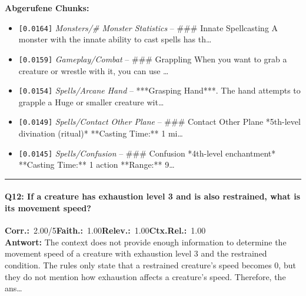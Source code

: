 \noindent\textbf{Abgerufene Chunks:}
\begin{itemize}[noitemsep, topsep=2pt]
  \item[\textbf{\#1}] \texttt{[0.0164]} \textit{Monsters/# Monster Statistics} -- \#\#\# Innate Spellcasting  A monster with the innate ability to cast spells has th\ldots
  \item[\textbf{\#2}] \texttt{[0.0159]} \textit{Gameplay/Combat} -- \#\#\# Grappling  When you want to grab a creature or wrestle with it, you can use \ldots
  \item[\textbf{\#3}] \texttt{[0.0154]} \textit{Spells/Arcane Hand} -- ***Grasping Hand***. The hand attempts to grapple a Huge or smaller creature wit\ldots
  \item[\textbf{\#4}] \texttt{[0.0149]} \textit{Spells/Contact Other Plane} -- \#\#\# Contact Other Plane  *5th-level divination (ritual)*  **Casting Time:** 1 mi\ldots
  \item[\textbf{\#5}] \texttt{[0.0145]} \textit{Spells/Confusion} -- \#\#\# Confusion  *4th-level enchantment*  **Casting Time:** 1 action  **Range:** 9\ldots
\end{itemize}
\vspace{4pt}
\hrule
\vspace{6pt}

\paragraph{Q12: If a creature has exhaustion level 3 and is also restrained, what is its movement speed?}
\noindent \textbf{Corr.:}~2.00/5\quad \textbf{Faith.:}~1.00\quad \textbf{Relev.:}~1.00\quad \textbf{Ctx.Rel.:}~1.00\\

\noindent\textbf{Antwort:} The context does not provide enough information to determine the movement speed of a creature with exhaustion level 3 and the restrained condition. The rules only state that a restrained creature's speed becomes 0, but they do not mention how exhaustion affects a creature's speed. Therefore, the ans\ldots


